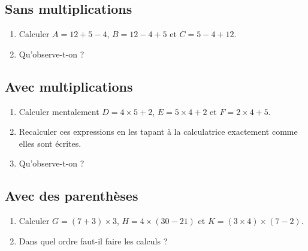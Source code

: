 
\subsection*{Sans multiplications}

\begin{enumerate}
    \item
Calculer \( A=12+5-4\), \( B=12-4+5\) et \( C=5-4+12\).
\item
    Qu'observe-t-on ?
\end{enumerate}

\subsection*{Avec multiplications}

\begin{enumerate}
    \item
        Calculer mentalement \( D=4\times 5+2\), \( E=5\times 4+2\) et \( F=2\times 4+5\).
    \item
        Recalculer ces expressions en les tapant à la calculatrice exactement comme elles sont écrites.
    \item
        Qu'observe-t-on ?
\end{enumerate}

\subsection*{Avec des parenthèses}

\begin{enumerate}
    \item
        Calculer \( G=(7+3)\times 3\), \( H=4\times (30-21)\) et \( K=(3\times 4)\times (7-2)\).
    \item
        Dans quel ordre faut-il faire les calculs ?
\end{enumerate}

